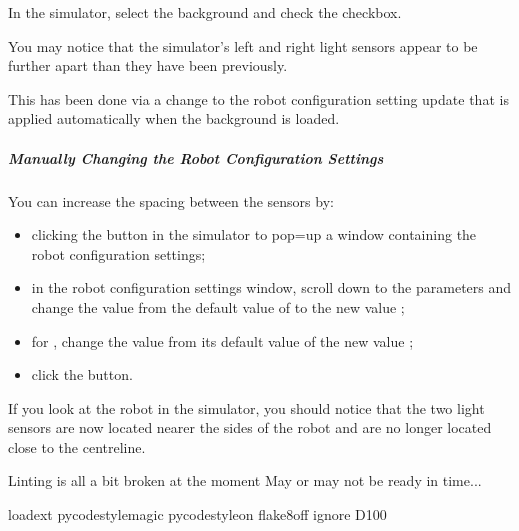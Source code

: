 \documentclass[letterpaper,10pt,english]{sphinxmanual}
\begin{document}
In the simulator, select the  background and check the  checkbox.

You may notice that the simulator’s left and right light sensors appear to be further apart than they have been previously.

This has been done via a change to the robot configuration setting update that is applied automatically when the  background is loaded.


\subparagraph{Manually Changing the Robot Configuration Settings}
\label{\detokenize{content/03_Robot_Lab/Section_00_03:Manually-Changing-the-Robot-Configuration-Settings}}
You can increase the spacing between the sensors by:
\begin{itemize}
\item {} 
clicking the  button in the simulator to pop=up a window containing the robot configuration settings;

\item {} 
in the robot configuration settings window, scroll down to the  parameters and change the  value from the default value of  to the new value ;

\item {} 
for , change the  value from its default value of  the new value ;

\item {} 
click the  button.

\end{itemize}

If you look at the robot in the simulator, you should notice that the two light sensors are now located nearer the sides of the robot and are no longer located close to the centreline.

{
\begin{sphinxVerbatim}[commandchars=\\\{\}]
\llap{\color{nbsphinxin}[ ]:\,\hspace{\fboxrule}\hspace{\fboxsep}}\PYGZsh{} Linting is all a bit broken at the moment
\PYGZsh{} May or may not be ready in time...

\PYGZsh{}\PYGZpc{}load\PYGZus{}ext pycodestyle\PYGZus{}magic
\PYGZsh{}\PYGZpc{}pycodestyle\PYGZus{}on
\PYGZsh{}\PYGZpc{}flake8\PYGZus{}off \PYGZhy{}\PYGZhy{}ignore D100
\end{sphinxVerbatim}
}
\end{document}
